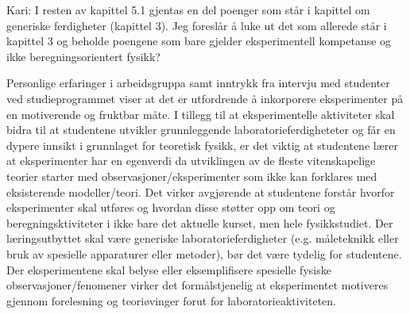 \documentclass{article}
\begin{document}
{\color{red}
Kari: I resten av kapittel 5.1  gjentas en del poenger som står i kapittel om generiske ferdigheter (kapittel 3). Jeg foreslår å luke ut det som allerede står i kapittel 3 og beholde poengene som bare gjelder eksperimentell kompetanse og ikke beregningsorientert fysikk?}

Personlige erfaringer i arbeidsgruppa samt inntrykk fra intervju med studenter ved studieprogrammet viser at det er utfordrende å inkorporere eksperimenter på en motiverende og fruktbar måte.
I tillegg til at eksperimentelle aktiviteter skal bidra til at studentene utvikler grunnleggende laboratorieferdigheteter og får en dypere innsikt i grunnlaget for teoretisk fysikk, er det viktig at studentene lærer at eksperimenter har en egenverdi da utviklingen av de fleste vitenskapelige teorier starter med observasjoner/eksperimenter som ikke kan forklares med eksisterende modeller/teori.  
Det virker avgjørende at studentene forstår hvorfor eksperimenter skal utføres og hvordan disse støtter opp om teori og beregningsktiviteter i ikke bare det aktuelle kurset, men hele fysikkstudiet.
Der læringsutbyttet skal være generiske laboratorieferdigheter (e.g. måleteknikk eller bruk av spesielle apparaturer eller metoder), bør det være tydelig for studentene.
Der eksperimentene skal belyse eller eksemplifisere spesielle fysiske observasjoner/fenomener virker det formålstjenelig at eksperimentet motiveres gjennom forelesning og teoriøvinger forut for laboratorieaktiviteten.
\end{document}
